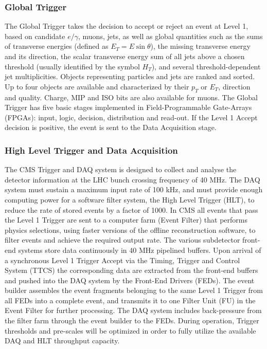 \subsubsection{Global Trigger}
The Global Trigger takes the decision to accept or reject an event at Level 1, based
on candidate $e/\gamma$, muons, jets, as well as global quantities such as the sums of
transverse energies (defined as $E_T=E\sin\theta$), the missing transverse energy and its direction, the scalar transverse energy sum of all jets above a chosen threshold (usually
identified by the symbol $H_T$), and several threshold-dependent jet multiplicities.
Objects representing particles and jets are ranked and sorted. Up to four objects
are available and characterized by their $p_T$ or $E_T$, direction and quality. Charge,
MIP and ISO bits are also available for muons. The Global Trigger has five basic
stages implemented in Field-Programmable Gate-Arrays (FPGAs): input, logic, decision, distribution and read-out.
If the Level 1 Accept decision is positive, the event is sent to the Data Acquisition
stage.

\subsubsection{High Level Trigger and Data Acquisition}
The CMS Trigger and DAQ system is designed to collect and analyse the detector
information at the LHC bunch crossing frequency of 40 MHz. The DAQ system 
must sustain a maximum input rate of 100 kHz,
and must provide enough computing power for a software filter system, the High
Level Trigger (HLT), to reduce the rate of stored events by a factor of 1000. In CMS
all events that pass the Level 1 Trigger are sent to a computer farm (Event Filter)
that performs physics selections, using faster versions of the offline reconstruction
software, to filter events and achieve the required output rate. The various subdetector 
front-end systems store data continuously in 40 MHz pipelined buffers.
Upon arrival of a synchronous Level 1 Trigger Accept via the Timing, Trigger and
Control System (TTCS) the corresponding data are extracted from the front-end
buffers and pushed into the DAQ system by the Front-End Drivers (FEDs). The
event builder assembles the event fragments belonging to the same Level 1 Trigger
from all FEDs into a complete event, and transmits it to one Filter Unit (FU) in
the Event Filter for further processing. The DAQ system includes back-pressure
from the filter farm through the event builder to the FEDs. During operation,
Trigger thresholds and pre-scales will be optimized in order to fully utilize the
available DAQ and HLT throughput capacity.

